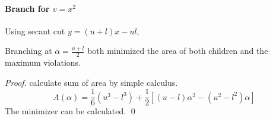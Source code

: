 \documentclass[../main]{subfiles}
\begin{document}
\paragraph{Branch for \(v= x^2\)}

Using secant cut \(y = (u + l)x - ul\),

\begin{proposition}
    Branching at \(\alpha = \frac{u + l}{2}\) both minimized the area of both children and the maximum violations.
\end{proposition}
\begin{proof}
    calculate sum of area by simple calculus.
    \begin{equation}
        A(\alpha) = \frac{1}{6}(u^3- l^3) + \frac{1}{2}\left[(u-l)\alpha^2 - (u^2-l^2)\alpha\right]
    \end{equation}
    The minimizer can be calculated. \hfill\qed
\end{proof}
\end{document}
